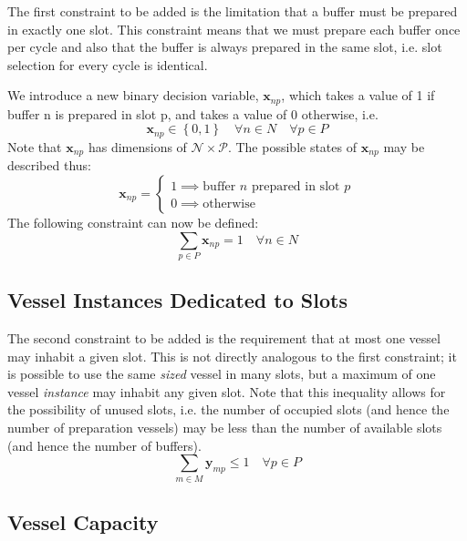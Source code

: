 The first constraint to be added is the limitation that a buffer must be
prepared in exactly one slot.
This constraint means that we must prepare each buffer once per cycle
and also that the buffer is always prepared in the same slot, i.e. slot
selection for every cycle is identical.

We introduce a new binary decision variable, $\boldsymbol{x}_{np}$, which takes
a value of 1 if buffer n is prepared in slot p, and takes a value of 0
otherwise, i.e.
\begin{equation}
    \boldsymbol{x}_{np} \in \left\{ 0, 1 \right\} \quad \forall n \in N \quad
    \forall p \in P
    \label{eq.x}
\end{equation}
Note that $\boldsymbol{x}_{np}$ has dimensions of
$\mathcal{N} \times \mathcal{P}$.
The possible states of $\boldsymbol{x}_{np}$ may be described thus:
\begin{equation}
    \boldsymbol{x}_{np} =
    \begin{cases}
        1 \implies \text{buffer $n$ prepared in slot $p$}\\
        0 \implies \text{otherwise}
    \end{cases}
\end{equation}
The following constraint can now be defined:
\begin{equation}
    \sum_{p \in P} \boldsymbol{x}_{np} = 1 \quad \forall n \in N
    \label{eq.constr1}
\end{equation}

\subsection{Vessel Instances Dedicated to Slots}\label{SS.constr2}

The second constraint to be added is the requirement that at most one vessel
may inhabit a given slot.
This is not directly analogous to the first constraint; it is possible to
use the same \emph{sized} vessel in many slots, but a maximum of one vessel
\emph{instance} may inhabit any given slot.
Note that this inequality allows for the possibility of unused slots, i.e. the
number of occupied slots (and hence the number of preparation vessels) may be
less than the number of available slots (and hence the number of buffers).
\begin{equation}
    \sum_{m \in M} \boldsymbol{y}_{mp} \le 1 \quad \forall p \in P
    \label{eq.constr2}
\end{equation}

\subsection{Vessel Capacity}\label{SS.constr3}

